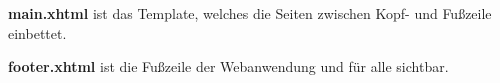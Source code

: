 \begin{samepage}
    \textbf{main.xhtml} ist das Template, welches die Seiten zwischen Kopf- und Fußzeile einbettet.

\end{samepage}

\begin{samepage}
    \textbf{footer.xhtml} ist die Fußzeile der Webanwendung und für alle sichtbar.
    \nopagebreak

\end{samepage}

